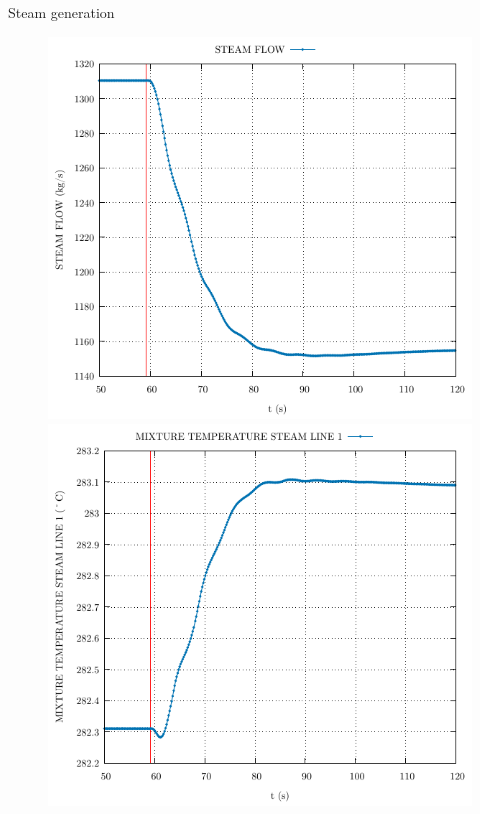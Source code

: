 	\begin{frame}{Steam generation}
		\begin{figure}
			\centering
			\begin{minipage}{.5\textwidth}
				\centering
				\includegraphics[width=0.8\linewidth]{./graphs/STEAM FLOW_comp.pdf}
			\end{minipage}%
			\begin{minipage}{.5\textwidth}
				\centering
				\includegraphics[width=0.8\linewidth]{./graphs/MIXTURE TEMPERATURE STEAM LINE 1_comp.pdf}
			\end{minipage}
		\end{figure}
		

\end{frame}
